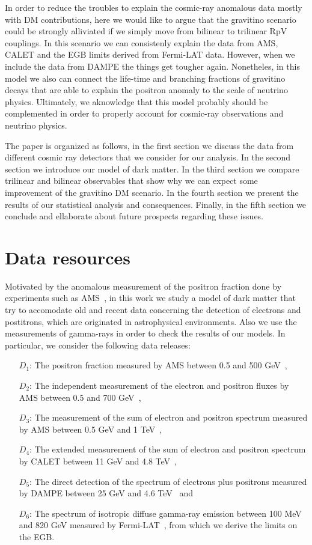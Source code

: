 \documentclass[a4paper,11pt]{article}
\begin{document}
In order to reduce the troubles to explain the cosmic-ray anomalous data mostly with DM contributions, here we would like to argue that the gravitino scenario could be strongly alliviated if we simply move from bilinear to trilinear RpV couplings. In this scenario we can consistenly explain the data from AMS, CALET and the EGB limits derived from Fermi-LAT data. However, when we include the data from DAMPE the things get tougher again. Nonetheles, in this model we also can connect the life-time and branching fractions of gravitino decays that are able to explain the positron anomaly to the scale of neutrino physics. Ultimately, we aknowledge that this model probably should be complemented in order to properly account for cosmic-ray observations and neutrino physics.

The paper is organized as follows, in the first section we discuss the data from different cosmic ray detectors that we consider for our analysis. In the second section we introduce our model of dark matter. In the third section we compare trilinear and bilinear observables that show why we can expect some improvement of the gravitino DM scenario. In the fourth section we present the results of our statistical analysis and consequences. Finally, in the fifth section we conclude and ellaborate about future prospects regarding these issues.


\section{Data resources}

Motivated by the anomalous measurement of the positron fraction done by experiments such as AMS~\cite{Accardo:2014lma}, in this work we study a model of dark matter that try to accomodate old and recent data concerning the detection of electrons and postitrons, which are originated in astrophysical environments. Also we use the measurements of gamma-rays in order to check the results of our models. In particular, we consider the following data releases:

\begin{itemize}
\item[$D_1$:] The positron fraction measured by AMS between 0.5 and 500 GeV~\cite{Accardo:2014lma},
\item[$D_2$:] The independent measurement of the electron and positron fluxes by AMS between 0.5 and 700 GeV~\cite{Aguilar:2014mma},
\item[$D_3$:] The measurement of the sum of electron and positron spectrum measured by AMS between 0.5 GeV and 1 TeV~\cite{Aguilar:2014fea},
\item[$D_4$:] The extended measurement of the sum of electron and positron spectrum by CALET between 11 GeV and 4.8 TeV~\cite{Adriani:2018ktz},
\item[$D_5$:] The direct detection of the spectrum of electrons plus positrons measured by DAMPE between 25 GeV and 4.6 TeV~\cite{Ambrosi:2017wek} and
\item[$D_6$:] The spectrum of isotropic diffuse gamma-ray emission between 100 MeV and 820 GeV measured by Fermi-LAT~\cite{Ackermann:2014usa}, from which we derive the limits on the EGB.
\end{itemize}
 
\end{document}
